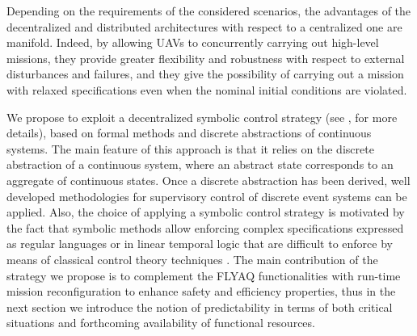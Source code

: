 \documentclass[letterpaper, 10 pt, conference]{ieeeconf}
\begin{document}
%
Depending on the requirements of the considered scenarios, the advantages of the decentralized and distributed architectures with respect to a centralized one are manifold. Indeed, by allowing UAVs to concurrently carrying out high-level missions, they provide greater flexibility and robustness with respect to external disturbances and failures, and they give the possibility of carrying out a mission with relaxed specifications even when the nominal initial conditions are violated.

We propose to exploit a decentralized symbolic control strategy (see \cite{Pola:TAC2016}, \cite{Pola:Decentralized} for more details), based on formal methods and discrete abstractions of continuous systems. 
The main feature of this approach is that it relies on the discrete abstraction of a continuous system, where an abstract state corresponds to an aggregate of continuous states. Once a discrete abstraction has been derived, well developed methodologies for supervisory control of discrete event systems can be applied.
Also, the choice of applying a symbolic control strategy is motivated by the fact that symbolic methods allow  enforcing complex specifications expressed as regular languages or in linear temporal logic that are difficult to enforce by means of classical control theory techniques \cite{Pola:Decentralized}. 
%
The main contribution of the strategy we propose is to complement the FLYAQ functionalities with run-time mission reconfiguration to enhance safety and efficiency properties, thus in the next section we introduce the notion of predictability in terms of both critical situations and forthcoming availability of functional resources.
\end{document}
